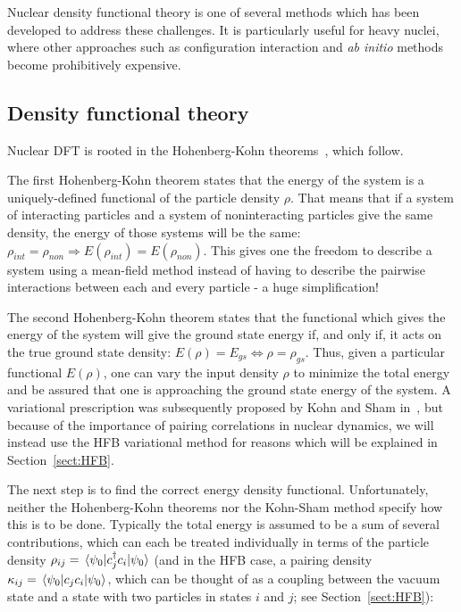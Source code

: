Nuclear density functional theory is one of several methods which has been developed to address these challenges. It is particularly useful for heavy nuclei, where other approaches such as configuration interaction and \textit{ab initio} methods become prohibitively expensive.

\subsection{Density functional theory}\label{sect:DFT}
Nuclear DFT is rooted in the Hohenberg-Kohn theorems~\cite{Hohenberg1964}, which follow.

The first Hohenberg-Kohn theorem states that the energy of the system is a uniquely-defined functional of the particle density $\rho$. That means that if a system of interacting particles and a system of noninteracting particles give the same density, the energy of those systems will be the same: $\rho_{int}=\rho_{non} \Rightarrow E(\rho_{int})=E(\rho_{non})$. This gives one the freedom to describe a system using a mean-field method instead of having to describe the pairwise interactions between each and every particle - a huge simplification!

The second Hohenberg-Kohn theorem states that the functional which gives the energy of the system will give the ground state energy if, and only if, it acts on the true ground state density: $E(\rho)=E_{gs} \iff \rho = \rho_{gs}$. Thus, given a particular functional $E(\rho)$, one can vary the input density $\rho$ to minimize the total energy and be assured that one is approaching the ground state energy of the system. A variational prescription was subsequently proposed by Kohn and Sham in~\cite{Kohn1965}, but because of the importance of pairing correlations in nuclear dynamics, we will instead use the HFB variational method for reasons which will be explained in Section~\ref{sect:HFB}.

The next step is to find the correct energy density functional. Unfortunately, neither the Hohenberg-Kohn theorems nor the Kohn-Sham method specify how this is to be done. Typically the total energy is assumed to be a sum of several contributions, which can each be treated individually in terms of the particle density $\rho_{ij} = \expval{c_j^\dagger c_i}{\psi_0}$ (and in the HFB case, a pairing density $\kappa_{ij} = \expval{c_jc_i}{\psi_0}$, which can be thought of as a coupling between the vacuum state and a state with two particles in states $i$ and $j$; see Section~\ref{sect:HFB}):

